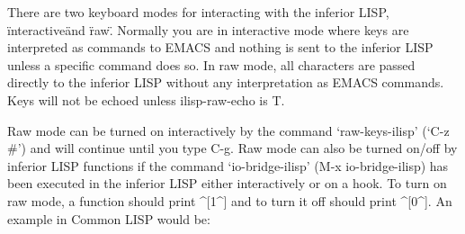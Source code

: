 There are two keyboard modes for interacting with the inferior LISP,
\"interactive\" and \"raw\".  Normally you are in interactive mode
where keys are interpreted as commands to EMACS and nothing is sent to
the inferior LISP unless a specific command does so.  In raw mode, all
characters are passed directly to the inferior LISP without any
interpretation as EMACS commands.  Keys will not be echoed unless
ilisp-raw-echo is T.

Raw mode can be turned on interactively by the command
`raw-keys-ilisp' (`C-z \#') and will continue until you type C-g. Raw
mode can also be turned on/off by inferior LISP functions if the
command `io-bridge-ilisp' (M-x io-bridge-ilisp) has been executed in
the inferior LISP either interactively or on a hook.  To turn on raw
mode, a function should print ^[1^] and to turn it off should print
^[0^].  An example in Common LISP would be:


\hskip 35pt 

\subsection{}

\copyrightnotice

\bye

